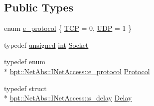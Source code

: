 \subsection*{Public Types}
\begin{DoxyCompactItemize}
\item 
enum \hyperlink{classbpt_1_1_net_abs_1_1_i_net_access_a70cd44d0ad16551eca809b2aed896ad5}{e\-\_\-protocol} \{ \hyperlink{classbpt_1_1_net_abs_1_1_i_net_access_a70cd44d0ad16551eca809b2aed896ad5af53af92f9948871036abdf973fb007fa}{T\-C\-P} = 0, 
\hyperlink{classbpt_1_1_net_abs_1_1_i_net_access_a70cd44d0ad16551eca809b2aed896ad5acac50ba5c5464ad8ab5f095c9b5496ce}{U\-D\-P} = 1
 \}
\item 
typedef \hyperlink{curses_8priv_8h_aca40206900cfc164654362fa8d4ad1e6}{unsigned} \hyperlink{term__entry_8h_ad65b480f8c8270356b45a9890f6499ae}{int} \hyperlink{classbpt_1_1_net_abs_1_1_i_net_access_ae5a8cad46f8006b85b535f126b697efc}{Socket}
\item 
typedef enum \\*
\hyperlink{classbpt_1_1_net_abs_1_1_i_net_access_a70cd44d0ad16551eca809b2aed896ad5}{bpt\-::\-Net\-Abs\-::\-I\-Net\-Access\-::e\-\_\-protocol} \hyperlink{classbpt_1_1_net_abs_1_1_i_net_access_a4464fb7197d6a70c84c93aadaae560f6}{Protocol}
\item 
typedef struct \\*
\hyperlink{structbpt_1_1_net_abs_1_1_i_net_access_1_1s__delay}{bpt\-::\-Net\-Abs\-::\-I\-Net\-Access\-::s\-\_\-delay} \hyperlink{classbpt_1_1_net_abs_1_1_i_net_access_a0bbbaf7492f6c93185acd8b359a347d1}{Delay}
\end{DoxyCompactItemize}
